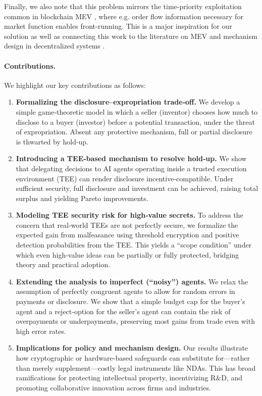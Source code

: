 \documentclass{article}
\begin{document}
Finally, we also note that this problem mirrors the time-priority exploitation common in blockchain MEV \citep{daian2020flash}, where e.g. order flow information necessary for market function enables front-running. This is a major inspiration for our solution as well as connecting this work to the literature on MEV and mechanism design in decentralized systems \citep{roughgarden2020transaction, capponi2023adoption}.

\paragraph{Contributions.}
We highlight our key contributions as follows:
\begin{enumerate}[noitemsep]
\item \textbf{Formalizing the disclosure–expropriation trade‐off.} We develop a simple game‐theoretic model in which a seller (inventor) chooses how much to disclose to a buyer (investor) before a potential transaction, under the threat of expropriation. Absent any protective mechanism, full or partial disclosure is thwarted by hold‐up.

\item \textbf{Introducing a TEE‐based mechanism to resolve hold‐up.} 
We show that delegating decisions to AI agents operating inside a trusted execution environment (TEE) can render disclosure incentive‐compatible. Under sufficient security, full disclosure and investment can be achieved, raising total surplus and yielding Pareto improvements.

\item \textbf{Modeling TEE security risk for high‐value secrets.}
To address the concern that real‐world TEEs are not perfectly secure, we formalize the expected gain from malfeasance using threshold encryption and positive detection probabilities from the TEE. This yields a “scope condition” under which even high‐value ideas can be partially or fully protected, bridging theory and practical adoption.

\item \textbf{Extending the analysis to imperfect (“noisy”) agents.} 
We relax the assumption of perfectly congruent agents to allow for random errors in payments or disclosure. We show that a simple budget cap for the buyer’s agent and a reject‐option for the seller’s agent can contain the risk of overpayments or underpayments, preserving most gains from trade even with high error rates.

\item \textbf{Implications for policy and mechanism design.} 
Our results illustrate how cryptographic or hardware‐based safeguards can substitute for—rather than merely supplement—costly legal instruments like NDAs. This has broad ramifications for protecting intellectual property, incentivizing R\&D, and promoting collaborative innovation across firms and industries.
\end{enumerate}
\end{document}
